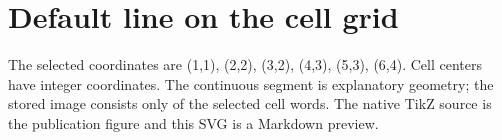 \section{Default line on the cell
  grid}\label{007-bresenham-line-x-grid-default-line-on-the-cell-grid}

The selected coordinates are (1,1), (2,2), (3,2), (4,3), (5,3), (6,4).
Cell centers have integer coordinates. The continuous segment is
explanatory geometry; the stored image consists only of the selected
cell words. The native TikZ source is the publication figure and this
SVG is a Markdown preview.


